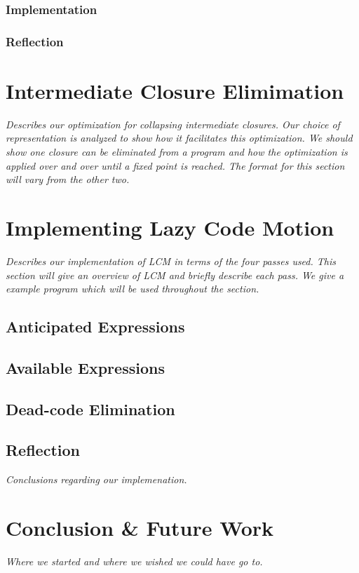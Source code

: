 \documentclass[12pt]{report}
\begin{document}
\subsection{Implementation}
\subsection{Reflection}

\chapter{Intermediate Closure Elimimation}
\emph{Describes our optimization for collapsing intermediate
closures. Our choice of representation is analyzed to
show how it facilitates this optimization. We should show one
closure can be eliminated from a program and how the optimization
is applied over and over until a fixed point is reached. The format
for this section will vary from the other two.}

\chapter{Implementing Lazy Code Motion}
\emph{Describes our implementation of LCM in terms of the four passes
  used. This section will give an overview of LCM and briefly describe
  each pass. We give a example program which will be used throughout
  the section.}

\section{Anticipated Expressions}

\section{Available Expressions}

\section{Dead-code Elimination}

\section{Reflection}

\emph{Conclusions regarding our implemenation.}

\chapter{Conclusion \& Future Work}

\emph{Where we started and where we wished we could have go to.}
\end{document}
